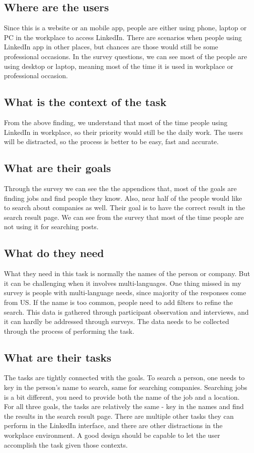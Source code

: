 \documentclass[
	letterpaper, %
]{jdf}
\begin{document}
\subsection{Where are the users}
Since this is a website or an mobile app, people are either using phone, laptop or PC in the workplace to access LinkedIn. There are scenarios when people using LinkedIn app in other places, but chances are those would still be some professional occasions. In the survey questions, we can see most of the people are using desktop or laptop, meaning most of the time it is used in workplace or professional occasion.

\subsection{What is the context of the task}
From the above finding, we understand that most of the time people using LinkedIn in workplace, so their priority would still be the daily work. The users will be distracted, so the process is better to be easy, fast and accurate. 

\subsection{What are their goals}
Through the survey we can see the the appendices that, most of the goals are finding jobs and find people they know. Also, near half of the people would like to search about companies as well. Their goal is to have the correct result in the search result page. We can see from the survey that most of the time people are not using it for searching posts.

\subsection{What do they need}
What they need in this task is normally the names of the person or company. But it can be challenging when it involves multi-languages. One thing missed in my survey is people with multi-language needs, since majority of the responses come from US. If the name is too common, people need to add filters to refine the search. This data is gathered through participant observation and interviews, and it can hardly be addressed through surveys. The data needs to be collected through the process of performing the task.

\subsection{What are their tasks}
The tasks are tightly connected with the goals. To search a person, one needs to key in the person's name to search, same for searching companies. Searching jobs is a bit different, you need to provide both the name of the job and a location. For all three goals, the tasks are relatively the same - key in the names and find the results in the search result page. There are multiple other tasks they can perform in the LinkedIn interface, and there are other distractions in the workplace environment. A good design should be capable to let the user accomplish the task given those contexts.
\end{document}
